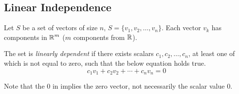 \subsection{Linear Independence}\label{subsec:Linear_Independence}
\begin{theorem}\label{thm:Linearly_Dependent}
  Let $S$ be a set of vectors of size $n$, $S = \lbrace v_{1}, v_{2}, \ldots, v_{n} \rbrace$.
  Each vector $v_{k}$ has components in $\operatorname{\mathbb{R}}^{m}$ ($m$ components from $\operatorname{\mathbb{R}}$).

  The set is \emph{linearly dependent} if there exists scalars $c_{1}, c_{2}, \ldots, c_{n}$, at least one of which is not equal to zero, such that the below equation holds true.
  \begin{equation}\label{eq:Linearly_Dependent}
    c_{1}v_{1} + c_{2}v_{2} + \cdots + c_{n}v_{n} = 0
  \end{equation}

  \begin{remark*}
    Note that the $0$ in  implies the zero vector, not necessarily the scalar value $0$.
  \end{remark*}
\end{theorem}


